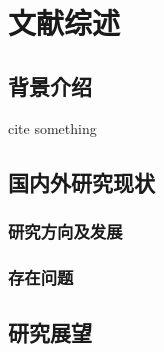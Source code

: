 \chapter{文献综述}

\section{背景介绍}
cite something~\cite{article1}
\section{国内外研究现状}

\subsection{研究方向及发展}

\subsection{存在问题}

\section{研究展望}


{
\renewcommand{\bibsection}{\section{\bibname}}

}



